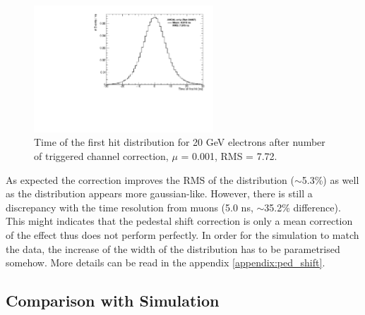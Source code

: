 \documentclass[twoside,a4paper,11pt]{article}
\begin{document}
\begin{figure}[htbp]
\begin{center}
\includegraphics[width=0.6\textwidth]{fig/Electrons_Full/Timing_AllLayers.pdf}
\caption{Time of the first hit distribution for 20 GeV electrons after number of triggered channel correction, $\mu$ = 0.001, RMS = 7.72.}
\label{fig:timing_electrons_corr}
\end{center}
\end{figure}
As expected the correction improves the RMS of the distribution ($\sim$5.3\%) as well as the distribution appears more gaussian-like. However, there is still a discrepancy with the time resolution from muons (5.0 ns, $\sim$35.2\% difference). This might indicates that the pedestal shift correction is only a mean correction of the effect thus does not perform perfectly. In order for the simulation to match the data, the increase of the width of the distribution has to be parametrised somehow. More details can be read in the appendix \ref{appendix:ped_shift}.

\subsection{Comparison with Simulation}
\end{document}
